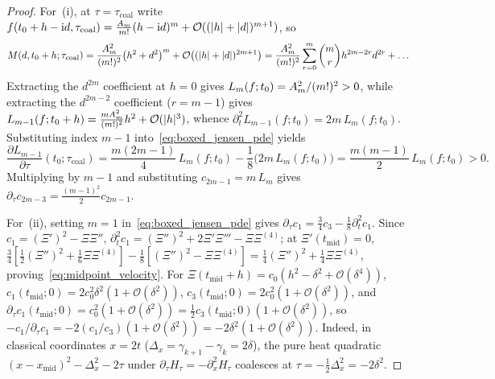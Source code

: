 \documentclass[11pt,reqno]{amsart}
\theoremstyle{plain}
\theoremstyle{definition}
\theoremstyle{remark}
\numberwithin{equation}{section}
\newcommand{\ii}{\mathrm{i}}
\newcommand{\fac}{\mathclose{\mathchar"0021}}
\begin{document}
\begin{proof}
For~(i), at $\tau = \tau_{\mathrm{coal}}$ write $f(t_0 + h - \ii d, \tau_{\mathrm{coal}}) = \frac{A_m}{m\fac}(h - \ii d)^m + \mathcal{O}((\lvert h\rvert + \lvert d\rvert)^{m+1})$, so
\[
M(d, t_0 + h; \tau_{\mathrm{coal}}) = \frac{A_m^2}{(m\fac)^2}\bigl(h^2 + d^2\bigr)^m + \mathcal{O}\bigl((\lvert h\rvert + \lvert d\rvert)^{2m+1}\bigr) = \frac{A_m^2}{(m\fac)^2}\sum_{r=0}^m \binom{m}{r} h^{2m-2r} d^{2r} + \dots
\]
Extracting the $d^{2m}$ coefficient at $h = 0$ gives $L_m(f; t_0) = A_m^2/(m\fac)^2 > 0$, while extracting the $d^{2m-2}$ coefficient ($r = m - 1$) gives $L_{m-1}(f; t_0 + h) = \frac{m A_m^2}{(m\fac)^2}h^2 + \mathcal{O}(\lvert h\rvert^3)$, whence $\partial_t^2 L_{m-1}(f; t_0) = 2m\,L_m(f; t_0)$. Substituting index $m - 1$ into~\eqref{eq:boxed_jensen_pde} yields
\[
\frac{\partial L_{m-1}}{\partial\tau}(t_0; \tau_{\mathrm{coal}}) = \frac{m(2m - 1)}{4}\,L_m(f; t_0) - \frac{1}{8}\bigl(2m\,L_m(f; t_0)\bigr) = \frac{m(m - 1)}{2}\,L_m(f; t_0) > 0.
\]
Multiplying by $m - 1$ and substituting $c_{2m-1} = m\,L_m$ gives $\partial_\tau c_{2m-3} = \frac{(m-1)^2}{2}c_{2m-1}$.

For~(ii), setting $m = 1$ in~\eqref{eq:boxed_jensen_pde} gives $\partial_\tau c_1 = \frac{3}{4}c_3 - \frac{1}{8}\partial_t^2 c_1$. Since $c_1 = (\Xi')^2 - \Xi\Xi''$, $\partial_t^2 c_1 = (\Xi'')^2 + 2\Xi'\Xi''' - \Xi\Xi^{(4)}$; at $\Xi'(t_{\mathrm{mid}}) = 0$, $\frac{3}{4}[\frac{1}{2}(\Xi'')^2 + \frac{1}{6}\Xi\Xi^{(4)}] - \frac{1}{8}[(\Xi'')^2 - \Xi\Xi^{(4)}] = \frac{1}{4}(\Xi'')^2 + \frac{1}{4}\Xi\Xi^{(4)}$, proving~\eqref{eq:midpoint_velocity}. For $\Xi(t_{\mathrm{mid}} + h) = c_0(h^2 - \delta^2 + \mathcal{O}(\delta^4))$, $c_1(t_{\mathrm{mid}}; 0) = 2c_0^2\delta^2(1 + \mathcal{O}(\delta^2))$, $c_3(t_{\mathrm{mid}}; 0) = 2c_0^2(1 + \mathcal{O}(\delta^2))$, and $\partial_\tau c_1(t_{\mathrm{mid}}; 0) = c_0^2(1 + \mathcal{O}(\delta^2)) = \frac{1}{2}c_3(t_{\mathrm{mid}}; 0)(1 + \mathcal{O}(\delta^2))$, so $-c_1/\partial_\tau c_1 = -2(c_1/c_3)(1 + \mathcal{O}(\delta^2)) = -2\delta^2(1 + \mathcal{O}(\delta^2))$. Indeed, in classical coordinates $x = 2t$ ($\Delta_x = \gamma_{k+1} - \gamma_k = 2\delta$), the pure heat quadratic $(x - x_{\mathrm{mid}})^2 - \Delta_x^2 - 2\tau$ under $\partial_\tau H_\tau = -\partial_x^2 H_\tau$ coalesces at $\tau = -\frac{1}{2}\Delta_x^2 = -2\delta^2$.
\end{proof}
\end{document}
